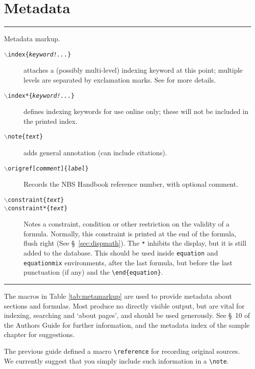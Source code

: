 \documentclass[twoside]{article}
\newcommand{\token}[1]{\texttt{#1}}
\newcommand{\BS}{$\backslash$}
\newenvironment{Table}[1]{%
   \begin{table}[htb]\hrule\begin{centering}\caption{#1}}{%
   \par\end{centering}\hrule\end{table}}
\newenvironment{Description}{%
   \begingroup\def\arraystretch{1.3}\small\begin{description}}{%
   \end{description}\endgroup}
\begin{document}
\section{Metadata}\label{sec:meta}
\begin{Table}{Metadata markup.\label{tab:metamarkup}}
\begin{Description}
\item[\texttt{\BS index\{\textit{keyword!...}\}}] 
   attaches a (possibly multi-level) indexing keyword at this point; 
   multiple levels are separated by exclamation marks.
   See \cite[App.~A]{Lamport:1985:LDP} for more details.
\item[\texttt{\BS index*\{\textit{keyword!...}\}}] 
   defines indexing keywords for use online only; these will not be
   included in the printed index.
\item[\texttt{\BS note\{\textit{text}\}}]
   adds general annotation (can include citations).
\item[\texttt{\BS origref[\textit{comment}]\{\textit{label}\}}] 
   Records the NBS Handbook reference number, with optional comment.
\item[\texttt{\BS constraint\{\textit{text}\}}] 
\item[\texttt{\BS constraint*\{\textit{text}\}}] 
  Notes a constraint, condition or other restriction on the validity
  of a formula. Normally, this constraint is printed at the end of the
  formula, flush right (See \S~\ref{sec:dispmath}).
  The \verb|*| inhibits the display, but it is still added to the database.
  This should be used inside \token{equation} and \token{equationmix}
  environments, after the last formula, but before the last punctuation 
  (if any) and the \verb|\end{equation}|.
\end{Description}
\end{Table}
The macros in Table \ref{tab:metamarkup} are used to provide metadata
about sections and formulas.  Most produce no directly visible output, but
are vital for indexing, searching and `about pages', and should
be used generously.  See \S~10 of the Authors Guide for further information,
and the metadata index of the sample chapter for suggestions.

The previous guide defined a macro \verb|\reference| for recording original
sources.  We currently suggest that you simply include such information
in a \verb|\note|.
\end{document}
